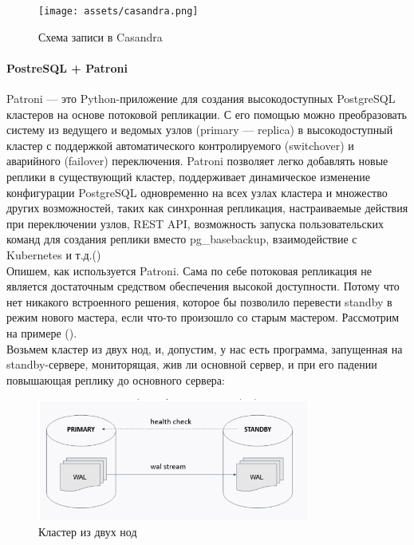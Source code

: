 \begin{figure}[h]
    \centering
    \texttt{[image: assets/casandra.png]}
    \caption{Схема записи в Casandra}
    \label{fig:mesh1}
\end{figure}

\paragraph{PostreSQL + Patroni}
Patroni — это Python-приложение для создания высокодоступных PostgreSQL кластеров на основе потоковой репликации. С его помощью можно преобразовать систему из ведущего и ведомых узлов (primary — replica) в высокодоступный кластер с поддержкой автоматического контролируемого (switchover) и аварийного (failover) переключения. Patroni позволяет легко добавлять новые реплики в существующий кластер, поддерживает динамическое изменение конфигурации PostgreSQL одновременно на всех узлах кластера и множество других возможностей, таких как синхронная репликация, настраиваемые действия при переключении узлов, REST API, возможность запуска пользовательских команд для создания реплики вместо pg_basebackup, взаимодействие с Kubernetes и т.д.(\autocite{Klyukin}) \\
Опишем, как используется Patroni. Сама по себе потоковая репликация не является достаточным средством обеспечения высокой доступности. Потому что нет никакого встроенного решения, которое бы позволило перевести standby в режим нового мастера, если что-то произошло со старым мастером. Рассмотрим на примере (\autocite{Aristov}).\\
Возьмем кластер из двух нод, и, допустим, у нас есть программа, запущенная на standby-сервере, мониторящая, жив ли основной сервер, и при его падении повышающая реплику до основного сервера:

\begin{figure}[h]
    \centering
    \includegraphics[width=0.8\textwidth]{assets/Patroni1.png}
    \caption{Кластер из двух нод}
    \label{fig:mesh1}
\end{figure}

